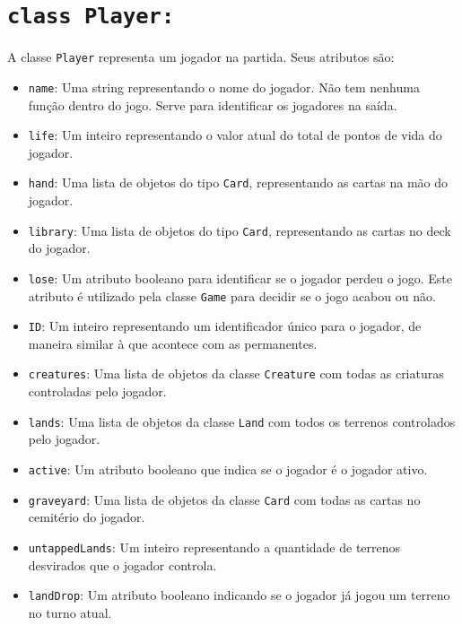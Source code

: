 \section{\texttt{class Player:}}
A classe \texttt{Player} representa um jogador na partida. Seus atributos são:
\begin{itemize}
  \item\texttt{name}: Uma string representando o nome do jogador. Não tem nenhuma função
  dentro do jogo. Serve para identificar os jogadores na saída.
  \item\texttt{life}: Um inteiro representando o valor atual do total de pontos de vida
  do jogador.
  \item\texttt{hand}: Uma lista de objetos do tipo \texttt{Card}, representando as cartas
  na mão do jogador.
  \item\texttt{library}: Uma lista de objetos do tipo \texttt{Card}, representando as cartas
  no deck do jogador.
  \item\texttt{lose}: Um atributo booleano para identificar se o jogador perdeu o jogo. Este
  atributo é utilizado pela classe \texttt{Game} para decidir se o jogo acabou ou não.
  \item\texttt{ID}: Um inteiro representando um identificador único para o jogador, de maneira
  similar à que acontece com as permanentes.
  \item\texttt{creatures}: Uma lista de objetos da classe \texttt{Creature} com todas as
  criaturas controladas pelo jogador.
  \item\texttt{lands}: Uma lista de objetos da classe \texttt{Land} com todos os terrenos
  controlados pelo jogador.
  \item\texttt{active}: Um atributo booleano que indica se o jogador é o jogador ativo.
  \item\texttt{graveyard}: Uma lista de objetos da classe \texttt{Card} com todas as cartas
  no cemitério do jogador.
  \item\texttt{untappedLands}: Um inteiro representando a quantidade de terrenos desvirados que
  o jogador controla.
  \item\texttt{landDrop}: Um atributo booleano indicando se o jogador já jogou um terreno no
  turno atual.
\end{itemize}

